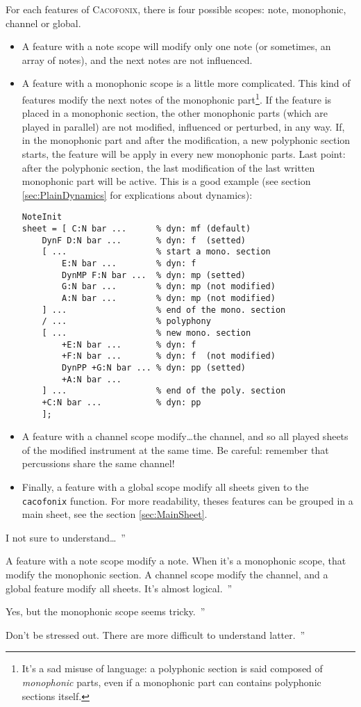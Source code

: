 \documentclass{article}
\newcommand{\cacofonix}{\textsc{Cacofonix}\xspace}
\newenvironment{meenv}{ \par \noindent \makebox[6em][r]{ \textcolor{mecolor}{Me}: `` --~}}{~''}
\newenvironment{myselfenv}{ \par \noindent \makebox[6em][r]{ \textcolor{myselfcolor}{Myself}: `` --~}}{~''}
\newcommand{\me}[1]{\begin{meenv}#1\end{meenv}}
\newcommand{\myself}[1]{\begin{myselfenv}#1\end{myselfenv}}
\begin{document}
For each features of \cacofonix, there is four possible scopes: note, monophonic, channel or global.
\begin{itemize}
	\item A feature with a note scope will modify only one note (or sometimes, an array of notes), and the next notes are not influenced.
	\item A feature with a monophonic scope is a little more complicated. This kind of features modify the next notes of the monophonic part\footnote{It's a sad misuse of language: a polyphonic section is said composed of \emph{monophonic} parts, even if a monophonic part can contains polyphonic sections itself.}. If the feature is placed in a monophonic section, the other monophonic parts (which are played in parallel) are not modified, influenced or perturbed, in any way. If, in the monophonic part and after the modification, a new polyphonic section starts, the feature will be apply in every new monophonic parts. Last point: after the polyphonic section, the last modification of the last written monophonic part will be active. This is a good example (see section \ref{sec:PlainDynamics} for explications about dynamics):
\begin{lstlisting}
NoteInit
sheet = [ C:N bar ...      % dyn: mf (default)
	DynF D:N bar ...       % dyn: f  (setted)
	[ ...                  % start a mono. section
		E:N bar ...        % dyn: f
		DynMP F:N bar ...  % dyn: mp (setted)
		G:N bar ...        % dyn: mp (not modified)
		A:N bar ...        % dyn: mp (not modified)
	] ...                  % end of the mono. section
	/ ...                  % polyphony
	[ ...                  % new mono. section
		+E:N bar ...       % dyn: f
		+F:N bar ...       % dyn: f  (not modified)
		DynPP +G:N bar ... % dyn: pp (setted)
		+A:N bar ...
	] ...                  % end of the poly. section
	+C:N bar ...           % dyn: pp
	];
\end{lstlisting}
	\item A feature with a channel scope modify\dots the channel, and so all played sheets of the modified instrument at the same time. Be careful: remember that percussions share the same channel!
	\item Finally, a feature with a global scope modify all sheets given to the \lstinline!cacofonix! function. For more readability, theses features can be grouped in a main sheet, see the section \ref{sec:MainSheet}.
\end{itemize}

\me{I not sure to understand\dots}
\myself{A feature with a note scope modify a note. When it's a monophonic scope, that modify the monophonic section. A channel scope modify the channel, and a global feature modify all sheets. It's almost logical.}
\me{Yes, but the monophonic scope seems tricky.}
\myself{Don't be stressed out. There are more difficult to understand latter.}
\end{document}
